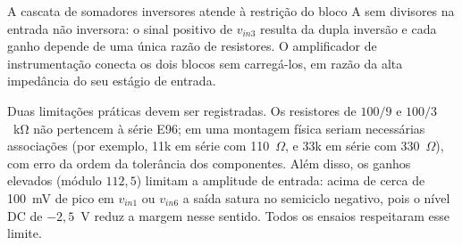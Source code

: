 A cascata de somadores inversores atende à restrição do bloco A sem
divisores na entrada não inversora: o sinal positivo de $v_{in3}$
resulta da dupla inversão e cada ganho depende de uma única razão de
resistores. O amplificador de instrumentação conecta os dois blocos
sem carregá-los, em razão da alta impedância do seu estágio de
entrada.

Duas limitações práticas devem ser registradas. Os resistores de
$100/9$ e $100/3$~\si{\kilo\ohm} não pertencem à série E96; em uma
montagem física seriam necessárias associações (por exemplo, 11k em
série com 110~$\Omega$, e 33k em série com 330~$\Omega$), com erro da
ordem da tolerância dos componentes. Além disso, os ganhos elevados
(módulo $112{,}5$) limitam a amplitude de entrada: acima de cerca de
\SI{100}{\milli\volt} de pico em $v_{in1}$ ou $v_{in6}$ a saída
satura no semiciclo negativo, pois o nível DC de $-2{,}5$~V reduz a
margem nesse sentido. Todos os ensaios respeitaram esse limite.
